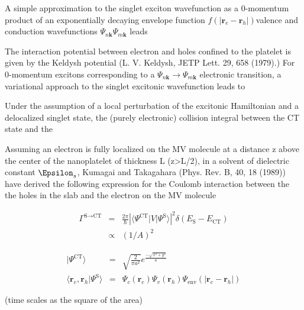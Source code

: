 \documentclass[book]{revtex4}
\begin{document}
A simple approximation to the singlet exciton wavefunction as a 0-momentum product of an exponentially decaying envelope function  $f\left(\vert\mathbf{r}_e - \mathbf{r}_h \vert \right)$valence and conduction wavefunctions  $\Psi_{n\mathbf{k}}  \Psi_{m\mathbf{k} }$ leads 
 
The interaction potential between electron and holes confined to the platelet is given by the Keldysh potential (L. V. Keldysh, JETP Lett. 29, 658 (1979).) 
For 0-momentum excitons corresponding to a $\Psi_{n\mathbf{k}} \rightarrow \Psi_{m\mathbf{k}}$ electronic transition, a variational approach to the singlet excitonic wavefunction leads to 

Under the assumption of a local perturbation of the excitonic Hamiltonian and a delocalized singlet state, the (purely electronic) collision integral between the CT state and the 


Assuming an electron is fully localized on the MV molecule at a distance z above the center of the nanoplatelet of thickness L (z>L/2), in a solvent of dielectric constant $\Epsilon_s$, Kumagai and Takagahara (Phys. Rev. B, 40, 18 (1989)) have derived the following expression for the Coulomb interaction between the the holes in the slab and the electron on the MV molecule

\begin{eqnarray*}
\Gamma^{\textrm{S} \rightarrow  \textrm{CT}} &=& \frac{2\pi}{\hbar} \left| \langle \Psi^{\textrm{CT}} \vert V  \vert \Psi^{\textrm{S}} \rangle \right|^2 \delta\left(  E_\textrm{S} - E_\textrm{CT} \right) \\
 &\propto&  (1/ A)^2 
\end{eqnarray*}


\begin{eqnarray*}
\vert \Psi^{\textrm{CT}} \rangle  &=&   \sqrt{\frac{2}{\pi a^2}} e^{\frac{-\sqrt{x^2 + y^2}}{a}} \\ 
\langle  \mathbf{r}_e, \mathbf{r}_h  \vert \Psi^{\textrm{S}} \rangle &=&  \Psi_{c}\left( \mathbf{r}_e \right) \Psi_v \left( \mathbf{r}_h \right) \Psi_{\textrm{env}}\left( \vert\mathbf{r}_e - \mathbf{r}_h \vert \right) 
\end{eqnarray*}


(time scales as the square of the area)
\end{document}
